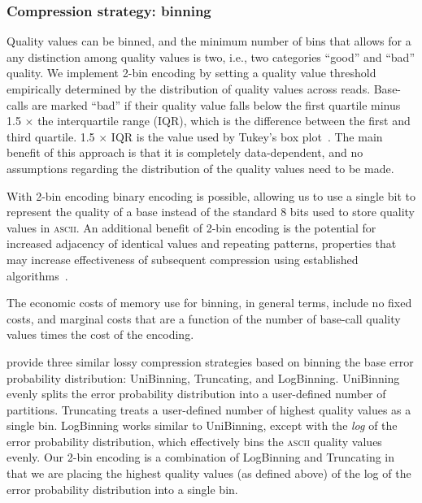 \documentclass[12pt,\mydriver]{thesis}
\begin{document}
\subsubsection{Compression strategy: binning}

Quality values can be binned, and the minimum number of bins that
allows for a any distinction among quality values is two, i.e., two
categories ``good'' and ``bad'' quality. We implement 2-bin encoding
by setting a quality value threshold empirically determined by the
distribution of quality values across reads. Base-calls are marked
``bad'' if their quality value falls below the first quartile minus
1.5 $\times$ the interquartile range (IQR), which is the difference
between the first and third quartile. 1.5 $\times$ IQR is the value
used by Tukey's box plot~\cite{mcgill1978variations}. The main
benefit of this approach is that it is completely data-dependent, and
no assumptions regarding the distribution of the quality values need
to be made.

With 2-bin encoding binary encoding is possible, allowing us to use a
single bit to represent the quality of a base instead of the standard
8 bits used to store quality values in \textsc{ascii}. An additional
benefit of 2-bin encoding is the potential for increased adjacency of
identical values and repeating patterns, properties that may increase
effectiveness of subsequent compression using established
algorithms~\cite{HUFFMAN:1952nr,Ziv77auniversal,
  DBLP:journals/tit/ZivL78}.

The economic costs of memory use for binning, in general terms,
include no fixed costs, and marginal costs that are a function of the
number of base-call quality values times the cost of the encoding.

\cite{Wan:2012kq} provide three similar lossy compression strategies based on binning the base error probability distribution: UniBinning, Truncating, and LogBinning.
UniBinning evenly splits the error probability distribution into a user-defined number of partitions.
Truncating treats a user-defined number of highest quality values as a single bin.
LogBinning works similar to UniBinning, except with the \emph{log} of the error probability distribution, which effectively bins the \textsc{ascii} quality values evenly.
Our 2-bin encoding is a combination of LogBinning and Truncating in that we are placing the highest quality values (as defined above) of the log of the error probability distribution into a single bin.
\end{document}
